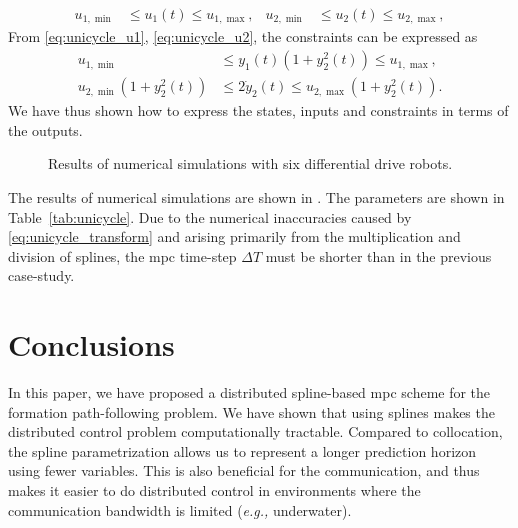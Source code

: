\begin{align}
    u_{1, \min} &\leq u_1(t) \leq u_{1, \max}, &
    u_{2, \min} &\leq u_2(t) \leq u_{2, \max},
\end{align}
From \eqref{eq:unicycle_u1}, \eqref{eq:unicycle_u2}, the constraints can be expressed as
\begin{subequations}
    \begin{align}
        u_{1, \min} &\leq y_1(t) \left(1 + y_2^2(t)\right) \leq u_{1, \max}, \\
        u_{2, \min}\left(1 + y_2^2(t)\right) &\leq 2 \dot{y}_2(t) \leq u_{2, \max}\left(1 + y_2^2(t)\right).
    \end{align}
\end{subequations}
We have thus shown how to express the states, inputs and constraints in terms of the outputs.

\begin{figure*}[t]
    \centering
    \begin{subfigure}{0.48\textwidth}
        \centering
        
        
    \end{subfigure}
    \begin{subfigure}{0.48\textwidth}
        \centering
        
        
    \end{subfigure}
    \caption{Results of numerical simulations with six differential drive robots.}
    \label{fig:unicycle_simulations}
    
\end{figure*}

The results of numerical simulations are shown in .
The parameters are shown in Table~\ref{tab:unicycle}.
Due to the numerical inaccuracies caused by \eqref{eq:unicycle_transform} and arising primarily from the multiplication and division of splines, the \gls{mpc} time-step $\Delta T$ must be shorter than in the previous case-study.


\section{Conclusions}
\label{sec:conclusion}


In this paper, we have proposed a distributed spline-based \gls{mpc} scheme for the formation path-following problem.
We have shown that using splines makes the distributed control problem computationally tractable.
Compared to collocation, the spline parametrization allows us to represent a longer prediction horizon using fewer variables.    
This is also beneficial for the communication, and thus makes it easier to do distributed control in environments where the communication bandwidth is limited (\emph{e.g.,} underwater).


